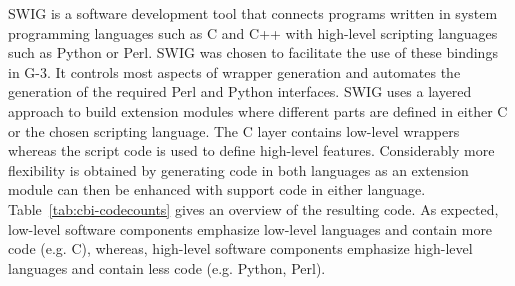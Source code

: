 \documentclass[10pt]{article}
\begin{document}
SWIG is a software development tool that connects programs written
in system programming languages such as C and C++ with high-level scripting 
languages such as Python or Perl. SWIG was chosen to facilitate 
the use of these bindings in
G-3. It controls most aspects of wrapper
generation and automates the generation of the required Perl and
Python interfaces. SWIG uses a layered approach to build extension
modules where different parts are defined in either C or the chosen
scripting language. The C layer contains low-level wrappers whereas
the script code is used to define high-level features.  Considerably
more flexibility is obtained by generating code in both languages as
an extension module can then be enhanced with support code in either
language.  Table~\ref{tab:cbi-codecounts} gives an overview of the
resulting code.  As expected, low-level software components emphasize
low-level languages and contain more code (e.g. C), whereas, high-level
software components emphasize high-level languages and contain less
code (e.g. Python, Perl).

\end{document}

